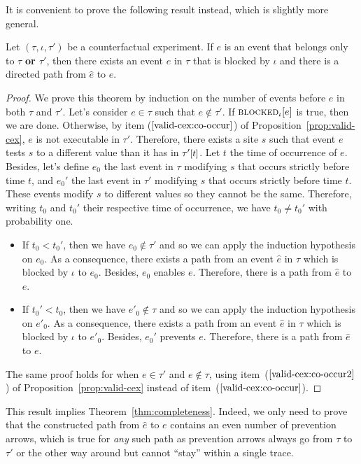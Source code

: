 It is convenient to prove the following result instead, which is
slightly more general.

\smallskip

\begin{theorem*} Let $(\tau, \iota, \tau')$ be a counterfactual
  experiment. If $e$ is an event that belongs only to $\tau$
  \textbf{or $\tau'$}, then there exists an event $\hat e$ in
  $\tau$ that is blocked by $\iota$ and there is a directed path 
  from $\hat e$ to $e$.
\end{theorem*}

\begin{proof}
  We prove this theorem by induction on the number of events before
  $e$ in both $\tau$ and $\tau'$. Let's consider $e \in \tau$ such
  that $e \notin \tau'$. If ${\textsc{blocked}}_{\iota}[e]$ is true, then we are
  done. Otherwise, by item ($\ref{valid-cex:co-occur}$) of
  Proposition~\ref{prop:valid-cex}, $e$ is not executable in
  $\tau'$. Therefore, there exists a site $s$ such that event $e$
  tests $s$ to a different value than it has in $\TSTATE{t}{\tau'}$.
  Let $t$ the time of occurrence of $e$.  Besides, let's define $e_0$
  the last event in $\tau$ modifying $s$ that occurs strictly before
  time $t$, and $e_0'$ the last event in $\tau'$ modifying $s$ that
  occurs strictly before time $t$. These events modify $s$ to
  different values so they cannot be the same. Therefore, writing
  $t_0$ and $t_0'$ their respective time of occurrence, we have
  $t_0 \neq t_0'$ with probability one.

  \begin{itemize}
  \item If $t_0 < t_0'$, then we have $e_0 \notin \tau'$
    and so we can apply the induction hypothesis on $e_0$. As a
    consequence, there exists a path from an event $\hat e$ in $\tau$
    which is blocked by $\iota$ to $e_0$. Besides, $e_0$ enables
    $e$. Therefore, there is a path from $\hat e$ to $e$.
  \item If $t_0' < t_0$, then we have $e'_0 \notin \tau$
    and so we can apply the induction hypothesis on $e'_0$. As a
    consequence, there exists a path from an event $\hat e$ in $\tau$
    which is blocked by $\iota$ to $e'_0$. Besides, $e_0'$ prevents
    $e$. Therefore, there is a path from $\hat e$ to $e$.
  \end{itemize}
  The same proof holds for when $e \in \tau'$ and $e \notin \tau$,
  using item~($\ref{valid-cex:co-occur2}$) of
  Proposition~\ref{prop:valid-cex} instead of
  item~($\ref{valid-cex:co-occur}$).
\end{proof}
This result implies Theorem~\ref{thm:completeness}. Indeed, we only
need to prove that the constructed path from $\hat e$ to $e$ contains
an even number of prevention arrows, which is true for \textit{any}
such path as prevention arrows always go from $\tau$ to $\tau'$ or the
other way around but cannot ``stay'' within a single trace.
